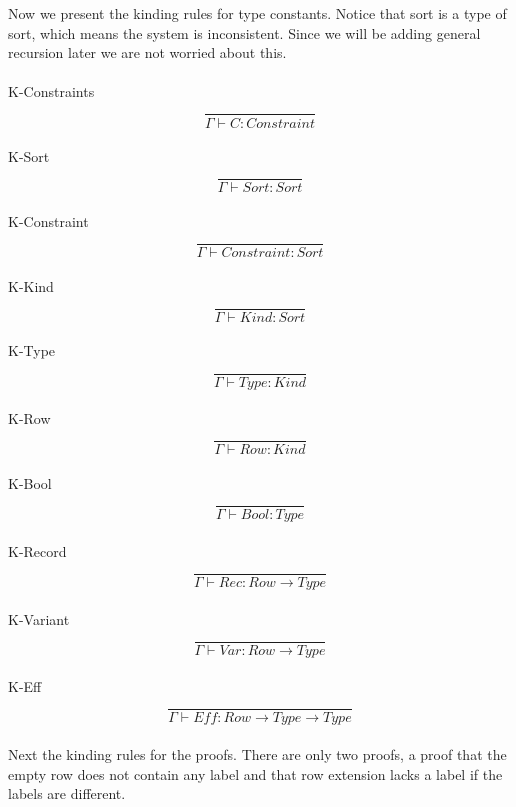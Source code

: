 \documentclass[12pt]{article}
\newcommand\tconstr[0]{C} %
\newcommand\tarr[2]{#1 \rightarrow #2} %
\newcommand\tconstraint[0]{\textit{Constraint}} %
\newcommand\tsort[0]{\textit{Sort}} %
\newcommand\tkind[0]{\textit{Kind}} %
\newcommand\ttype[0]{\textit{Type}} %
\newcommand\trow[0]{\textit{Row}} %
\newcommand\tbool[0]{\textit{Bool}} %
\newcommand\tvariant[0]{\textit{Var}} %
\newcommand\trecord[0]{\textit{Rec}} %
\newcommand\teff[0]{\textit{Eff}} %
\begin{document}
Now we present the kinding rules for type constants. Notice that sort is a type of sort, which means the system is inconsistent. Since we will be adding general recursion later we are not worried about this. \\\\
K-Constraints \[\frac{
	\begin{array}{l}
	\end{array}
}{
	\Gamma \vdash \tconstr : \tconstraint
}\]\\
K-Sort \[\frac{
	\begin{array}{l}
	\end{array}
}{
	\Gamma \vdash \tsort : \tsort
}\]\\
K-Constraint \[\frac{
	\begin{array}{l}
	\end{array}
}{
	\Gamma \vdash \tconstraint : \tsort
}\]\\
K-Kind \[\frac{
	\begin{array}{l}
	\end{array}
}{
	\Gamma \vdash \tkind : \tsort
}\]\\
K-Type \[\frac{
	\begin{array}{l}
	\end{array}
}{
	\Gamma \vdash \ttype : \tkind
}\]\\
K-Row \[\frac{
	\begin{array}{l}
	\end{array}
}{
	\Gamma \vdash \trow : \tkind
}\]\\
K-Bool \[\frac{
	\begin{array}{l}
	\end{array}
}{
	\Gamma \vdash \tbool : \ttype
}\]\\
K-Record \[\frac{
	\begin{array}{l}
	\end{array}
}{
	\Gamma \vdash \trecord : \tarr{\trow}{\ttype}
}\]\\
K-Variant \[\frac{
	\begin{array}{l}
	\end{array}
}{
	\Gamma \vdash \tvariant : \tarr{\trow}{\ttype}
}\]\\
K-Eff \[\frac{
	\begin{array}{l}
	\end{array}
}{
	\Gamma \vdash \teff : \tarr{\trow}{\tarr{\ttype}{\ttype}}
}\]\\
\newpage
Next the kinding rules for the proofs. There are only two proofs, a proof that the empty row does not contain any label and that row extension lacks a label if the labels are different. \\\\
\end{document}
